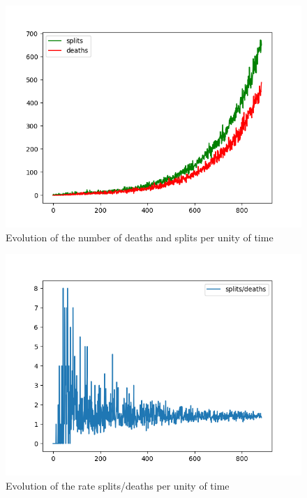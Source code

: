 \documentclass[a4paper]{article}
\theoremstyle{definition}
\begin{document}
\begin{figure}[!h]
\centering
\includegraphics[width=1\textwidth]{Figure_1.png}
\caption{Evolution of the number of deaths and splits per unity of time}
\end{figure}

\begin{figure}[!h]
\centering
\includegraphics[width=1\textwidth]{Figure_4.png}
\caption{Evolution of the rate splits/deaths per unity of time}
\end{figure}
\end{document}
